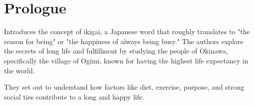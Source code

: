 \section*{Prologue}
Introduces the concept of ikigai, a Japanese word that roughly translates to "the reason for being" or "the happiness of always being busy." The authors explore the secrets of long life and fulfillment by studying the people of Okinawa, specifically the village of Ogimi, known for having the highest life expectancy in the world.

They set out to understand how factors like diet, exercise, purpose, and strong social ties contribute to a long and happy life.
